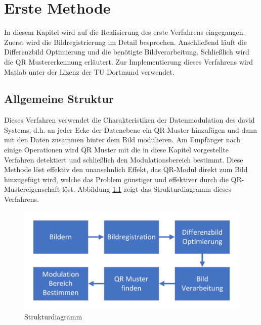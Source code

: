 \chapter{Erste Methode} \label{cha:Erste Methode}

In diesem Kapitel wird auf die Realisierung des erste Verfahrens eingegangen. Zuerst wird die Bildregistrierung im Detail besprochen. Anschließend läuft die Differenzbild Optimierung und die benötigte Bildverarbeitung. Schließlich wird die QR Mustererkennung erläutert. Zur Implementierung dieses Verfahrens wird Matlab unter der Lizenz der TU Dortmund verwendet.

\section{Allgemeine Struktur} 

Dieses Verfahren verwendet die Charakteristiken der Datenmodulation des \gls{david} Systems, d.h. an jeder Ecke der Datenebene ein QR Muster hinzufügen und dann mit den Daten zusammen hinter dem Bild modulieren. Am Empfänger nach einige Operationen wird QR Muster mit die in diese Kapitel vorgestellte Verfahren detektiert und schließlich den Modulationsbereich bestimmt. Diese Methode löst effektiv den unansehnlich Effekt, das QR-Modul direkt zum Bild hinzugefügt wird, welche das Problem günstiger und effektiver durch die QR-Mustereigenschaft löst. Abbildung \ref{fig:Strukturdiagramm} zeigt das Strukturdiagramm dieses Verfahrens.

\begin{figure}[H]
 \centering 
 \includegraphics[keepaspectratio,width=1.0\textwidth]{images/3_Ersteverfahren/Strukturdiagramm.pdf}
 \caption{Strukturdiagramm}
 \label{fig:Strukturdiagramm}
\end{figure}

